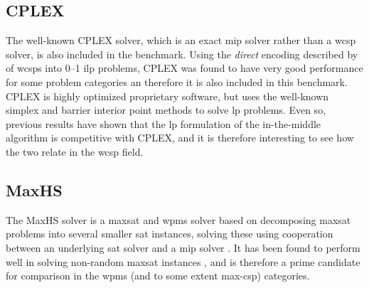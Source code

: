 \subsection{CPLEX}
The well-known CPLEX solver, which is an exact \gls{mip} solver rather than a \gls{wcsp} solver, is also included in the benchmark.
Using the \emph{direct} encoding described by \textcite[\pno~3]{deGivry14} of \glspl{wcsp} into 0--1 \gls{ilp} problems, CPLEX was found to have very good performance for some problem categories an therefore it is also included in this benchmark.
CPLEX is highly optimized proprietary software, but uses the well-known simplex and barrier interior point methods to solve \gls{lp} problems.
Even so, previous results \parencite{Mason01,Ernst05} have shown that the \gls{lp} formulation of the in-the-middle algorithm is competitive with CPLEX, and it is therefore interesting to see how the two relate in the \gls{wcsp} field.

\subsection{MaxHS}
The MaxHS solver is a \gls{maxsat} and \gls{wpms} solver based on decomposing \gls{maxsat} problems into several smaller \gls{sat} instances, solving these using cooperation between an underlying \gls{sat} solver and a \gls{mip} solver \parencite{Davies11}.
It has been found to perform well in solving non-random \gls{maxsat} instances \parencite{Davies13}, and is therefore a prime candidate for comparison in the \gls{wpms} (and to some extent max-\gls{csp}) categories.
